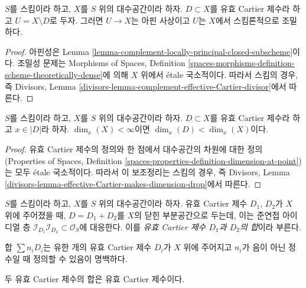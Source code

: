 \begin{lemma}
\label{lemma-complement-effective-Cartier-divisor}
$S$를 스킴이라 하고, $X$를 $S$ 위의 대수공간이라 하자.
$D \subset X$를 유효 Cartier 제수라 하고 $U = X \setminus D$로 두자.
그러면 $U \to X$는 아핀 사상이고 $U$는 $X$에서 스킴론적으로 조밀하다.
\end{lemma}

\begin{proof}
아핀성은 Lemma
\ref{lemma-complement-locally-principal-closed-subscheme}이다. 조밀성 문제는
Morphisms of Spaces, Definition
\ref{spaces-morphisms-definition-scheme-theoretically-dense}에 의해 $X$ 위에서
\'etale 국소적이다. 따라서 스킴의 경우, 즉 Divisors, Lemma
\ref{divisors-lemma-complement-effective-Cartier-divisor}에서 따른다.
\end{proof}

\begin{lemma}
\label{lemma-effective-Cartier-makes-dimension-drop}
$S$를 스킴이라 하고, $X$를 $S$ 위의 대수공간이라 하자.
$D \subset X$를 유효 Cartier 제수라 하고 $x \in |D|$라 하자.
$\dim_x(X) < \infty$이면 $\dim_x(D) < \dim_x(X)$이다.
\end{lemma}

\begin{proof}
유효 Cartier 제수의 정의와 한 점에서 대수공간의 차원에 대한 정의
(Properties of Spaces, Definition
\ref{spaces-properties-definition-dimension-at-point})는 모두 \'etale
국소적이다. 따라서 이 보조정리는 스킴의 경우, 즉 Divisors, Lemma
\ref{divisors-lemma-effective-Cartier-makes-dimension-drop}에서 따른다.
\end{proof}

\begin{definition}
\label{definition-sum-effective-Cartier-divisors}
$S$를 스킴이라 하고, $X$를 $S$ 위의 대수공간이라 하자. 유효 Cartier 제수
$D_1$, $D_2$가 $X$ 위에 주어졌을 때, $D = D_1 + D_2$를 $X$의 닫힌
부분공간으로 두는데, 이는 준연접 아이디얼 층
$\mathcal{I}_{D_1}\mathcal{I}_{D_2} \subset \mathcal{O}_S$에 대응한다. 이를
{\it 유효 Cartier 제수 $D_1$과 $D_2$의 합}이라
부른다.
\end{definition}

\noindent
합 $\sum n_iD_i$는 유한 개의 유효 Cartier 제수 $D_i$가 $X$ 위에 주어지고
$n_i$가 음이 아닌 정수일 때 정의할 수 있음이 명백하다.

\begin{lemma}
\label{lemma-sum-effective-Cartier-divisors}
두 유효 Cartier 제수의 합은 유효 Cartier 제수이다.
\end{lemma}

